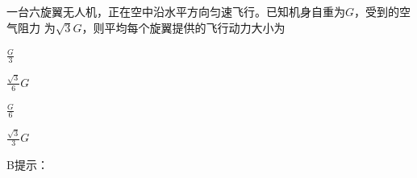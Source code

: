一台六旋翼无人机，正在空中沿水平方向匀速飞行。已知机身自重为\(G\)，受到的空气阻力	为\(\sqrt{3}G\)，则平均每个旋翼提供的飞行动力大小为\paren[]
\begin{choices}
	\item\(\frac{G}{3}\)
	\item\(\frac{\sqrt{3}}{6}G\)
	\item\(\frac{G}{6}\)
	\item\(\frac{\sqrt{3}}{3}G\)
\end{choices}
\begin{answer}
    B\qquad 提示：
\end{answer}